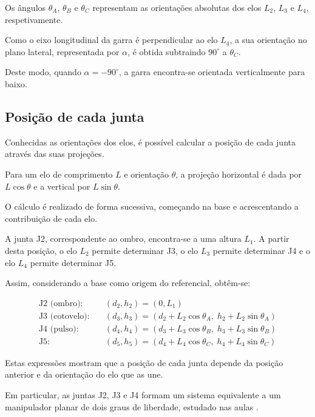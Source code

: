 Os ângulos $\theta_A$, $\theta_B$ e $\theta_C$ representam as orientações absolutas dos elos $L_2$, $L_3$ e $L_4$, respetivamente.

Como o eixo longitudinal da garra é perpendicular ao elo $L_4$, a sua orientação no plano lateral, representada por $\alpha$, é obtida subtraindo $90^\circ$ a $\theta_C$.

Deste modo, quando $\alpha=-90^\circ$, a garra encontra-se orientada verticalmente para baixo.

\subsection{Posição de cada junta}

Conhecidas as orientações dos elos, é possível calcular a posição de cada junta através das suas projeções.

Para um elo de comprimento $L$ e orientação $\theta$, a projeção horizontal é dada por $L\cos\theta$ e a vertical por $L\sin\theta$.

O cálculo é realizado de forma sucessiva, começando na base e acrescentando a contribuição de cada elo.

A junta J2, correspondente ao ombro, encontra-se a uma altura $L_1$. A partir desta posição, o elo $L_2$ permite determinar J3, o elo $L_3$ permite determinar J4 e o elo $L_4$ permite determinar J5.

Assim, considerando a base como origem do referencial, obtêm-se:

\begin{align}
    \text{J2 (ombro):}\quad
    &(d_2,h_2)=(0,L_1)
    \label{eq:j2}\\
    \text{J3 (cotovelo):}\quad
    &(d_3,h_3)=
    (d_2+L_2\cos\theta_A,\;
    h_2+L_2\sin\theta_A)
    \label{eq:j3}\\
    \text{J4 (pulso):}\quad
    &(d_4,h_4)=
    (d_3+L_3\cos\theta_B,\;
    h_3+L_3\sin\theta_B)
    \label{eq:j4}\\
    \text{J5:}\quad
    &(d_5,h_5)=
    (d_4+L_4\cos\theta_C,\;
    h_4+L_4\sin\theta_C)
    \label{eq:j5}
\end{align}

Estas expressões mostram que a posição de cada junta depende da posição anterior e da orientação do elo que as une.

Em particular, as juntas J2, J3 e J4 formam um sistema equivalente a um manipulador planar de dois graus de liberdade, estudado nas aulas \cite{bicho_2dof}.

